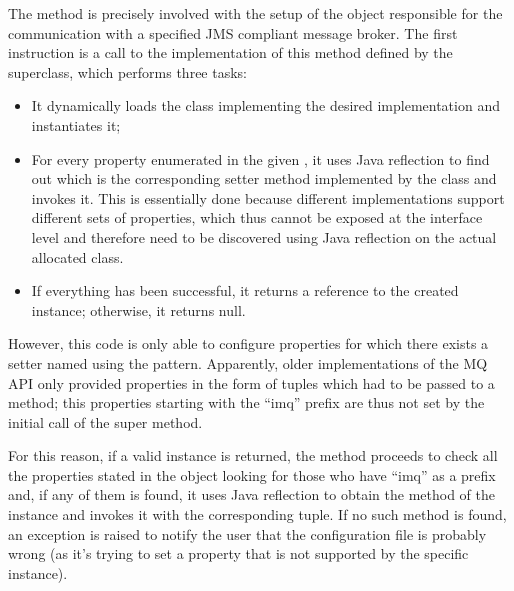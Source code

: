 The  method is precisely involved with the setup of the  object responsible for the communication with a specified JMS compliant message broker. The first instruction is a call to the implementation of this method defined by the  superclass, which performs three tasks:
\begin{itemize}
	\item It dynamically loads the class implementing the desired  implementation and instantiates it;
	\item For every property enumerated in the given , it uses Java reflection to find out which is the corresponding setter method implemented by the  class and invokes it. This is essentially done because different  implementations support different sets of properties, which thus cannot be exposed at the interface level and therefore need to be discovered using Java reflection on the actual allocated class. 
	\item If everything has been successful, it returns a reference to the created  instance; otherwise, it returns null.
\end{itemize}

However, this code is only able to configure properties for which there exists a setter named using the  pattern. Apparently, older implementations of the MQ API only provided properties in the form of  tuples which had to be passed to a  method; this properties starting with the “imq” prefix are thus not set by the initial call of the super  method.

For this reason, if a valid  instance is returned, the method proceeds to check all the properties stated in the  object looking for those who have “imq” as a prefix and, if any of them is found, it uses Java reflection to obtain the  method of the  instance and invokes it with the corresponding  tuple. If no such method is found, an exception is raised to notify the user that the configuration file is probably wrong (as it's trying to set a property that is not supported by the specific  instance). 

